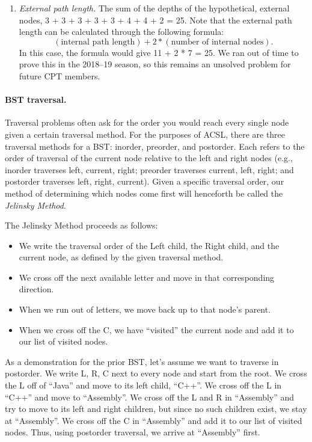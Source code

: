 \documentclass[10pt]{article}
\begin{document}
\begin{enumerate}
\item \textit{External path length.}
The sum of the depths of the hypothetical, external nodes,
3 + 3 + 3 + 3 + 3 + 4 + 4 + 2 = 25.
Note that the external path length can be calculated through the following formula:
\begin{equation*}
(\text{internal path length}) + 2 * (\text{number of internal nodes}).
\end{equation*}
In this case, the formula would give 11 + 2 * 7 = 25.
We ran out of time to prove this in the 2018--19 season, so this remains
an unsolved problem for future CPT members.
\end{enumerate}

\paragraph{BST traversal.}
Traversal problems often ask for the order you would reach every single node
given a certain traversal method.
For the purposes of ACSL, there are three traversal methods for a BST:
inorder, preorder, and postorder.
Each refers to the order of traversal of the current node relative to the
left and right nodes (e.g., inorder traverses left, current, right;
preorder traverses current, left, right;
and postorder traverses left, right, current).
Given a specific traversal order, our method of determining which nodes
come first will henceforth be called the \textit{Jelinsky Method}.

The Jelinsky Method proceeds as follows:
\begin{itemize}
\item We write the traversal order of the Left child, the Right child,
and the current node, as defined by the given traversal method.
\item We cross off
the next available letter and move in that corresponding direction.
\item When we run out of letters, we move
back up to that node's parent.
\item When we cross off the C, we have ``visited'' the current node
and add it to our list of visited nodes.
\end{itemize}

As a demonstration for the prior BST, let's assume we want to traverse in postorder.
We write L, R, C next to every node and start from the root.
We cross the L off of ``Java'' and move to its left child, ``C++''.
We cross off the L in ``C++'' and move to ``Assembly''.
We cross off the L and R in ``Assembly'' and try to move to its left and right children,
but since no such children exist, we stay at ``Assembly''.
We cross off the C in ``Assembly'' and add it to our list of visited nodes.
Thus, using postorder traversal, we arrive at ``Assembly'' first.
\end{document}
